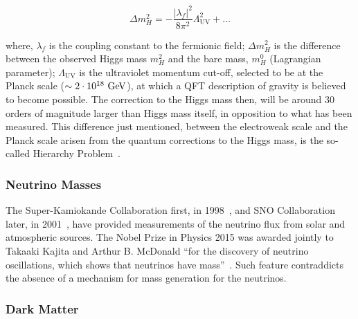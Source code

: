 
			\begin{equation}
			\label{eq:mH_fermionic_contribution}
			\Delta m_H^2 = - \frac{ | \lambda_f  |^2}{8 \pi ^2} \Lambda_{\mathrm{UV}}^2 + \dots 
			\end{equation}


			\noindent where, $\lambda_f$ is the coupling constant to the fermionic field; $\Delta m_H^2$ is the difference between the observed Higgs mass $m_H^2$ and the bare mass, $m_H^0$ (Lagrangian parameter); $\Lambda_{\mathrm{UV}}$ is the ultraviolet momentum cut-off, selected to be at the Planck scale ($\sim 2 \cdot 10^{18} \gev$), at which a QFT description of gravity is believed to become possible. The correction to the Higgs mass then, will be around 30 orders of magnitude larger than Higgs mass itself, in opposition to what has been measured. This difference just mentioned, between the electroweak scale and the Planck scale arisen from the quantum corrections to the Higgs mass, is the so-called Hierarchy Problem~\cite{Weinberg1976}.



		\subsubsection*{Neutrino Masses}

			The Super-Kamiokande Collaboration first, in 1998~\cite{SK1998}, and SNO Collaboration later, in 2001~\cite{SNO2001}, have provided measurements of the neutrino flux from solar and atmospheric sources. 
			The Nobel Prize in Physics 2015 was awarded jointly to Takaaki Kajita and Arthur B. McDonald ``for the discovery of neutrino oscillations, which shows that neutrinos have mass''~\cite{Nobel2015}. Such feature contraddicts the absence of a mechanism for mass generation for the neutrinos. 




		\subsubsection*{Dark Matter}

